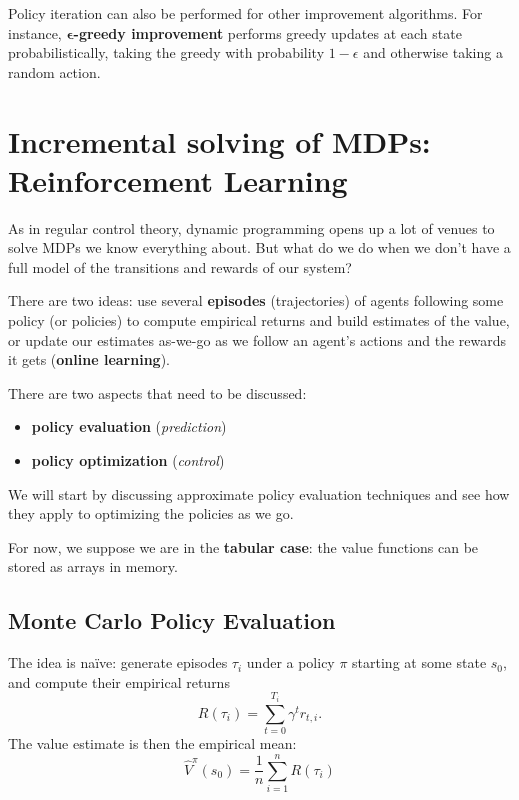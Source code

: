 \documentclass[../course-notes.tex]{subfiles}
\begin{document}
Policy iteration can also be performed for other improvement algorithms. For instance, \textbf{$\boldsymbol\epsilon$-greedy improvement} performs greedy updates at each state probabilistically, taking the greedy with probability $1-\epsilon$ and otherwise taking a random action.



\chapter{Incremental solving of MDPs: Reinforcement Learning}\label{chap:incrRL}

As in regular control theory, dynamic programming opens up a lot of venues to solve MDPs we know everything about. But what do we do when we don't have a full model of the transitions and rewards of our system?

There are two ideas: use several \textbf{\bluefont episodes} (trajectories) of agents following some policy (or policies) to compute empirical returns and build estimates of the value, or update our estimates as-we-go as we follow an agent's actions and the rewards it gets (\textbf{\bluefont online learning}).


There are two aspects that need to be discussed:
\begin{itemize}
	\item \textbf{policy evaluation} (\textit{prediction})
	\item \textbf{policy optimization} (\textit{control})
\end{itemize}


We will start by discussing approximate policy evaluation techniques and see how they apply to optimizing the policies as we go.

For now, we suppose we are in the \textbf{tabular case}: the value functions can be stored as arrays in memory.


\section{Monte Carlo Policy Evaluation}

The idea is naïve: generate episodes $\tau_i$ under a policy $\pi$ starting at some state $s_0$, and compute their empirical returns
\[
	R(\tau_i) = \sum_{t=0}^{T_i} \gamma^t r_{t,i}.
\]
The value estimate is then the empirical mean:
\begin{equation}
	\widehat{V}^\pi(s_0) = \frac{1}{n}\sum_{i=1}^{n} R(\tau_i)
\end{equation}
\end{document}
